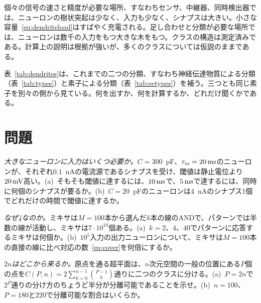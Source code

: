 \begin{keyblock}
\begin{proposition}[入力数は課題に従う]
\label{prop:dendrites}
個々の信号の速さと精度が必要な場所、すなわちセンサ、中継器、同時検出器では、ニューロンの樹状突起は少なく、入力も少なく、シナプスは大きい。小さな容量~\eqref{eq:dendriteload}はすばやく充電される。足し合わせと分類が必要な場所では、ニューロンは数千の入力をもつ大きな木をもつ。クラスの構造は測定済みである。計算上の説明は根拠が強いが、多くのクラスについては仮説のままである。
\end{proposition}
\end{keyblock}

表~\ref{tab:dendrites}は、これまでの二つの分類、すなわち神経伝達物質による分類（表~\ref{tab:types}）と素子による分類（表~\ref{tab:eetypes}）を補う。三つとも同じ素子を別々の側から見ている。何を出すか、何を計算するか、どれだけ聞くかである。

\section{問題}

\begin{exercise}[\lvlA]
\label{ex:19:1}
\emph{大きなニューロンに入力はいくつ必要か。}$C=300$~pF、$\tau_m=20\,\text{ms}$のニューロンが、それぞれ$0.1$~nAの電流源であるシナプスを受け、閾値は静止電位より$20\,\text{mV}$高い。(a)~そもそも閾値に達するには、$10\,\text{ms}$で、$5\,\text{ms}$で達するには、同時に何個のシナプスが要るか。(b)~$C=20$~pFのニューロンは$4$~nAのシナプス1個でどれだけの時間で閾値に達するか。
\end{exercise}

\begin{exercise}[\lvlA]
\label{ex:19:2}
\emph{なぜ4なのか。}ミキサは$M=100$本から選んだ$k$本の線のANDで、パターンでは半数の線が活動し、ミキサは$7\cdot10^{10}$個ある。(a)~$k=2$、$4$、$40$でパターンに応答するミキサは何個か。(b)~$10^5$入力の出力ニューロンについて、ミキサは$M=100$本の直接の線に比べ対応の数~\eqref{eq:cover}を何倍にするか。
\end{exercise}

\begin{exercise}[\lvlB]
\label{ex:19:3}
\emph{$2n$はどこから来るか。}原点を通る超平面は、$n$次元空間の一般の位置にある$P$個の点を$C(P,n)=2\sum_{k=0}^{n-1}\binom{P-1}{k}$通りに二つのクラスに分ける。(a)~$P=2n$で$2^P$通りの分け方のちょうど半分が分離可能であることを示せ。(b)~$n=100$、$P=180$と$220$で分離可能な割合はいくらか。
\end{exercise}

